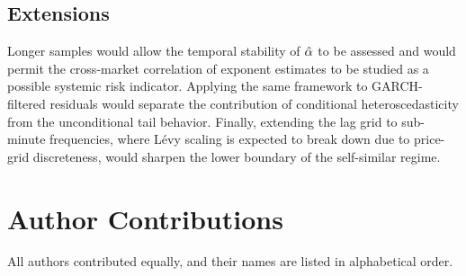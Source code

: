 \documentclass[conference]{IEEEtran}
\begin{document}
\subsection{Extensions}
Longer samples would allow the temporal stability of $\hat{\alpha}$ to be assessed
and would permit the cross-market correlation of exponent estimates to be
studied as a possible systemic risk indicator.
Applying the same framework to GARCH-filtered residuals would separate the
contribution of conditional heteroscedasticity from the unconditional tail
behavior.
Finally, extending the lag grid to sub-minute frequencies, where Lévy
scaling is expected to break down due to price-grid discreteness, would
sharpen the lower boundary of the self-similar regime.


\section*{Author Contributions}
All authors contributed equally, and their names are listed in alphabetical order.



\end{document}
